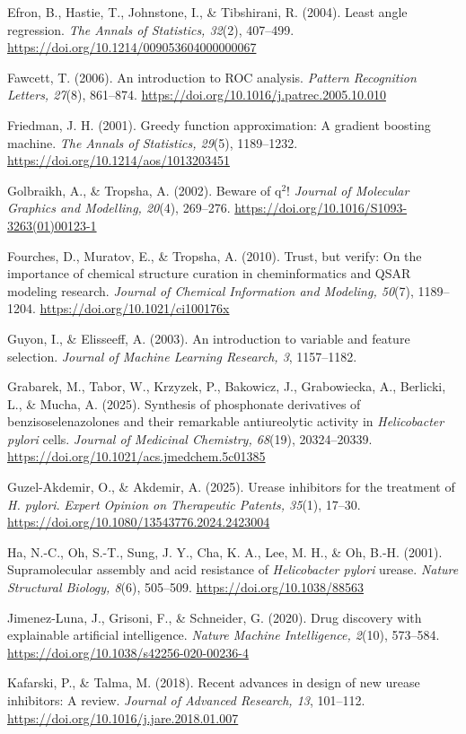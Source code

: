 \documentclass[11pt]{article}
\begin{document}
Efron, B., Hastie, T., Johnstone, I., \& Tibshirani, R. (2004). Least angle regression. \textit{The Annals of Statistics, 32}(2), 407--499. \url{https://doi.org/10.1214/009053604000000067}

Fawcett, T. (2006). An introduction to ROC analysis. \textit{Pattern Recognition Letters, 27}(8), 861--874. \url{https://doi.org/10.1016/j.patrec.2005.10.010}

Friedman, J. H. (2001). Greedy function approximation: A gradient boosting machine. \textit{The Annals of Statistics, 29}(5), 1189--1232. \url{https://doi.org/10.1214/aos/1013203451}

Golbraikh, A., \& Tropsha, A. (2002). Beware of q$^2$! \textit{Journal of Molecular Graphics and Modelling, 20}(4), 269--276. \url{https://doi.org/10.1016/S1093-3263(01)00123-1}

Fourches, D., Muratov, E., \& Tropsha, A. (2010). Trust, but verify: On the importance of chemical structure curation in cheminformatics and QSAR modeling research. \textit{Journal of Chemical Information and Modeling, 50}(7), 1189--1204. \url{https://doi.org/10.1021/ci100176x}

Guyon, I., \& Elisseeff, A. (2003). An introduction to variable and feature selection. \textit{Journal of Machine Learning Research, 3}, 1157--1182.

Grabarek, M., Tabor, W., Krzyzek, P., Bakowicz, J., Grabowiecka, A., Berlicki, L., \& Mucha, A. (2025). Synthesis of phosphonate derivatives of benzisoselenazolones and their remarkable antiureolytic activity in \textit{Helicobacter pylori} cells. \textit{Journal of Medicinal Chemistry, 68}(19), 20324--20339. \url{https://doi.org/10.1021/acs.jmedchem.5c01385}

Guzel-Akdemir, O., \& Akdemir, A. (2025). Urease inhibitors for the treatment of \textit{H. pylori}. \textit{Expert Opinion on Therapeutic Patents, 35}(1), 17--30. \url{https://doi.org/10.1080/13543776.2024.2423004}

Ha, N.-C., Oh, S.-T., Sung, J. Y., Cha, K. A., Lee, M. H., \& Oh, B.-H. (2001). Supramolecular assembly and acid resistance of \textit{Helicobacter pylori} urease. \textit{Nature Structural Biology, 8}(6), 505--509. \url{https://doi.org/10.1038/88563}

Jimenez-Luna, J., Grisoni, F., \& Schneider, G. (2020). Drug discovery with explainable artificial intelligence. \textit{Nature Machine Intelligence, 2}(10), 573--584. \url{https://doi.org/10.1038/s42256-020-00236-4}

Kafarski, P., \& Talma, M. (2018). Recent advances in design of new urease inhibitors: A review. \textit{Journal of Advanced Research, 13}, 101--112. \url{https://doi.org/10.1016/j.jare.2018.01.007}
\end{document}
